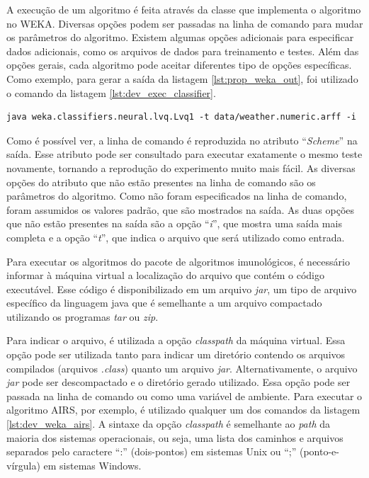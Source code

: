 A execução de um algoritmo é feita através da classe que implementa o algoritmo no WEKA. Diversas opções podem ser passadas na linha de comando para mudar os parâmetros do algoritmo. Existem algumas opções adicionais para especificar dados adicionais, como os arquivos de dados para treinamento e testes. Além das opções gerais, cada algoritmo pode aceitar diferentes tipo de opções específicas. Como exemplo, para gerar a saída da listagem \ref{lst:prop_weka_out}, foi utilizado o comando da listagem \ref{lst:dev_exec_classifier}.

\vspace{0.5cm}
\begin{lstlisting}[caption=Execução de um classificador, label=lst:dev_exec_classifier]
java weka.classifiers.neural.lvq.Lvq1 -t data/weather.numeric.arff -i
\end{lstlisting}
\vspace{0.5cm}

Como é possível ver, a linha de comando é reproduzida no atributo ``\emph{Scheme}'' na saída. Esse atributo pode ser consultado para executar exatamente o mesmo teste novamente, tornando a reprodução do experimento muito mais fácil. As diversas opções do atributo que não estão presentes na linha de comando são os parâmetros do algoritmo. Como não foram especificados na linha de comando, foram assumidos os valores padrão, que são mostrados na saída. As duas opções que não estão presentes na saída são a opção ``\emph{i}'', que mostra uma saída mais completa e a opção ``\emph{t}'', que indica o arquivo que será utilizado como entrada.

Para executar os algoritmos do pacote de algoritmos imunológicos, é necessário informar à máquina virtual a localização do arquivo que contém o código executável. Esse código é disponibilizado em um arquivo \emph{jar}, um tipo de arquivo específico da linguagem java que é semelhante a um arquivo compactado utilizando os programas \emph{tar} ou \emph{zip}.

Para indicar o arquivo, é utilizada a opção \emph{classpath} da máquina virtual. Essa opção pode ser utilizada tanto para indicar um diretório contendo os arquivos compilados (arquivos \emph{.class}) quanto um arquivo \emph{jar}. Alternativamente, o arquivo \emph{jar} pode ser descompactado e o diretório gerado utilizado. Essa opção pode ser passada na linha de comando ou como uma variável de ambiente. Para executar o algoritmo AIRS, por exemplo, é utilizado qualquer um dos comandos da listagem \ref{lst:dev_weka_airs}. A sintaxe da opção \emph{classpath} é semelhante ao \emph{path} da maioria dos sistemas operacionais, ou seja, uma lista dos caminhos e arquivos separados pelo caractere ``:'' (dois-pontos) em sistemas Unix ou ``;'' (ponto-e-vírgula) em sistemas Windows.

